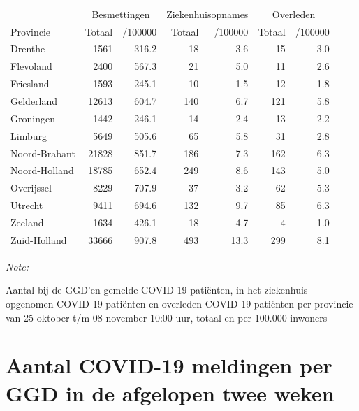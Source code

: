 \documentclass[
  english,
  man,floatsintext]{apa6}
\begin{document}
\begin{table}[H]
\centering
\begin{threeparttable}
\begin{tabular}{lrrrrrr}
\toprule
\multicolumn{1}{c}{ } & \multicolumn{2}{c}{Besmettingen} & \multicolumn{2}{c}{Ziekenhuisopnames} & \multicolumn{2}{c}{Overleden} \\
\cmidrule(l{3pt}r{3pt}){2-3} \cmidrule(l{3pt}r{3pt}){4-5} \cmidrule(l{3pt}r{3pt}){6-7}
Provincie & Totaal & /100000 & Totaal & /100000 & Totaal & /100000\\
\midrule
Drenthe & 1561 & 316.2 & 18 & 3.6 & 15 & 3.0\\
Flevoland & 2400 & 567.3 & 21 & 5.0 & 11 & 2.6\\
Friesland & 1593 & 245.1 & 10 & 1.5 & 12 & 1.8\\
Gelderland & 12613 & 604.7 & 140 & 6.7 & 121 & 5.8\\
Groningen & 1442 & 246.1 & 14 & 2.4 & 13 & 2.2\\
Limburg & 5649 & 505.6 & 65 & 5.8 & 31 & 2.8\\
Noord-Brabant & 21828 & 851.7 & 186 & 7.3 & 162 & 6.3\\
Noord-Holland & 18785 & 652.4 & 249 & 8.6 & 143 & 5.0\\
Overijssel & 8229 & 707.9 & 37 & 3.2 & 62 & 5.3\\
Utrecht & 9411 & 694.6 & 132 & 9.7 & 85 & 6.3\\
Zeeland & 1634 & 426.1 & 18 & 4.7 & 4 & 1.0\\
Zuid-Holland & 33666 & 907.8 & 493 & 13.3 & 299 & 8.1\\
\bottomrule
\end{tabular}
\begin{tablenotes}
\item \textit{Note: } 
\item Aantal bij de GGD’en gemelde COVID-19 patiënten, in het ziekenhuis opgenomen COVID-19 patiënten en overleden COVID-19 patiënten per provincie van 25 oktober t/m 08 november 10:00 uur, totaal en per 100.000 inwoners
\end{tablenotes}
\end{threeparttable}
\end{table}

\newpage

\hypertarget{aantal-covid-19-meldingen-per-ggd-in-de-afgelopen-twee-weken}{%
\section{Aantal COVID-19 meldingen per GGD in de afgelopen twee weken}\label{aantal-covid-19-meldingen-per-ggd-in-de-afgelopen-twee-weken}}
\end{document}
